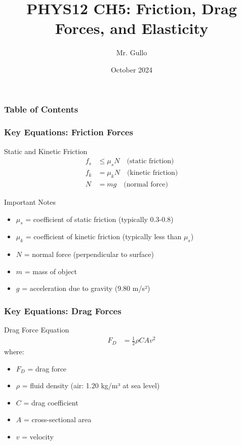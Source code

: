 \documentclass{beamer}
\title[ ]{PHYS12 CH5: Friction, Drag Forces, and Elasticity}
\subtitle{ }
\author[Mr. Gullo]{Mr. Gullo}
\date[Oct 2024]{October 2024}
\begin{document}
\frame{\titlepage}

\begin{frame}
\frametitle{Table of Contents}
\tableofcontents
\end{frame}
\begin{frame}
\frametitle{Key Equations: Friction Forces}
\begin{block}{Static and Kinetic Friction}
\begin{align*}
f_s &\leq \mu_s N \quad \text{(static friction)} \\
f_k &= \mu_k N \quad \text{(kinetic friction)} \\
N &= mg \quad \text{(normal force)}
\end{align*}
\end{block}


\begin{alertblock}{Important Notes}
\begin{itemize}
\item $\mu_s$ = coefficient of static friction (typically 0.3-0.8)
\item $\mu_k$ = coefficient of kinetic friction (typically less than $\mu_s$)
\item $N$ = normal force (perpendicular to surface)
\item $m$ = mass of object
\item $g$ = acceleration due to gravity (9.80 m/s²)
\end{itemize}
\end{alertblock}
\end{frame}

\begin{frame}
\frametitle{Key Equations: Drag Forces}
\begin{block}{Drag Force Equation}
\begin{align*}
F_D &= \frac{1}{2}\rho C A v^2
\end{align*}
where:
\begin{itemize}
\item $F_D$ = drag force
\item $\rho$ = fluid density (air: 1.20 kg/m³ at sea level)
\item $C$ = drag coefficient
\item $A$ = cross-sectional area
\item $v$ = velocity
\end{itemize}
\end{block}
\end{frame}
\end{document}

